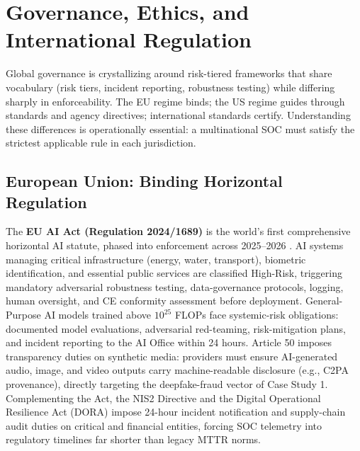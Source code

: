 \documentclass[conference,10pt,twocolumn,a4paper]{IEEEtran}
\begin{document}
\section{Governance, Ethics, and International Regulation}
\label{sec:governance}
Global governance is crystallizing around risk-tiered frameworks that share vocabulary (risk tiers, incident reporting, robustness testing) while differing sharply in enforceability. The EU regime binds; the US regime guides through standards and agency directives; international standards certify. Understanding these differences is operationally essential: a multinational SOC must satisfy the strictest applicable rule in each jurisdiction.

\subsection{European Union: Binding Horizontal Regulation}
The \textbf{EU AI Act (Regulation 2024/1689)} is the world's first comprehensive horizontal AI statute, phased into enforcement across 2025--2026 \cite{eu_ai_act_2024}. AI systems managing critical infrastructure (energy, water, transport), biometric identification, and essential public services are classified High-Risk, triggering mandatory adversarial robustness testing, data-governance protocols, logging, human oversight, and CE conformity assessment before deployment. General-Purpose AI models trained above $10^{25}$ FLOPs face systemic-risk obligations: documented model evaluations, adversarial red-teaming, risk-mitigation plans, and incident reporting to the AI Office within 24 hours. Article 50 imposes transparency duties on synthetic media: providers must ensure AI-generated audio, image, and video outputs carry machine-readable disclosure (e.g., C2PA provenance), directly targeting the deepfake-fraud vector of Case Study 1. Complementing the Act, the NIS2 Directive and the Digital Operational Resilience Act (DORA) impose 24-hour incident notification and supply-chain audit duties on critical and financial entities, forcing SOC telemetry into regulatory timelines far shorter than legacy MTTR norms.
\end{document}
